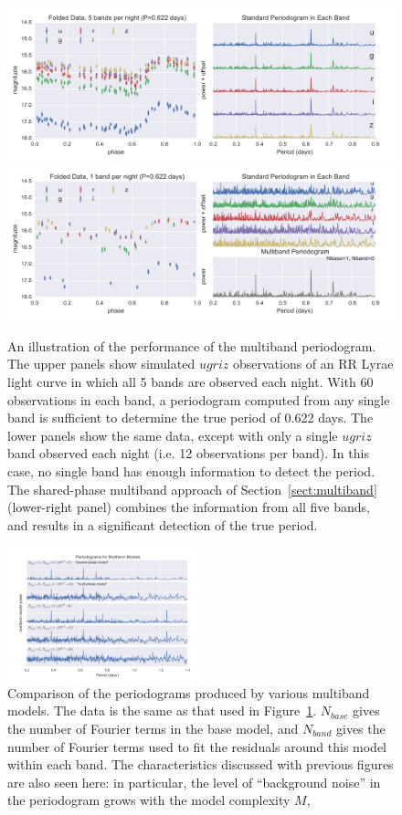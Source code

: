 \documentclass{emulateapj}
\newcommand{\Fig}[1]{Figure~\ref{fig:#1}}
\newcommand{\fig}[1]{\Fig{#1}}
\newcommand{\figlabel}[1]{\label{fig:#1}}
\newcommand{\Sect}[1]{Section~\ref{sect:#1}}
\newcommand{\sect}[1]{\Sect{#1}}
\begin{document}
\begin{figure}
  \centering
  \includegraphics[width=\textwidth]{fig05a.pdf}
  \includegraphics[width=\textwidth]{fig05b.pdf}
  \caption{
    An illustration of the performance of the multiband periodogram. The
    upper panels show simulated $ugriz$ observations of an RR Lyrae light
    curve in which all 5 bands are observed each night. With 60 observations
    in each band, a periodogram computed from any single band is sufficient to
    determine the true period of 0.622 days. The lower panels show the same
    data, except with only a single $ugriz$ band observed each night (i.e.
    12 observations per band). In this case, no single band has enough
    information to detect the period. The shared-phase multiband approach
    of \sect{multiband} (lower-right panel) combines the information from
    all five bands, and results in a significant detection of the true period.
  }
  \figlabel{multiband_sim}
\end{figure}

\begin{figure}
  \centering
  \includegraphics[width=0.5\textwidth]{fig06.pdf}
  \caption{
    Comparison of the periodograms produced by various multiband models.
    The data is the same as that used in \fig{multiband_sim}. $N_{base}$ gives
    the number of Fourier terms in the base model, and $N_{band}$ gives the
    number of Fourier terms used to fit the residuals around this model within
    each band. The characteristics discussed with previous figures are also
    seen here: in particular, the level of ``background noise'' in the
    periodogram grows with the model complexity $M$,
  } 
  \figlabel{multiband_models}
\end{figure}
\end{document}
